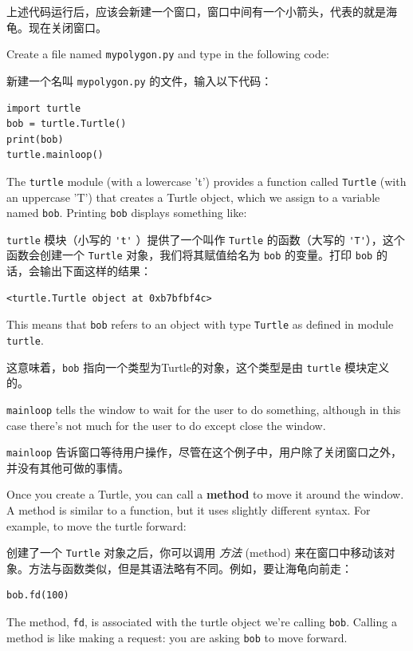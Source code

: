 上述代码运行后，应该会新建一个窗口，窗口中间有一个小箭头，代表的就是海龟。现在关闭窗口。

Create a file named {\tt mypolygon.py} and type in the following
code:

新建一个名叫  \lstinline{mypolygon.py} 的文件，输入以下代码：

\begin{lstlisting}
import turtle
bob = turtle.Turtle()
print(bob)
turtle.mainloop()
\end{lstlisting}


%
The {\tt turtle} module (with a lowercase 't') provides a function
called {\tt Turtle} (with an uppercase 'T') that creates a Turtle
object, which we assign to a variable named {\tt bob}.
Printing {\tt bob} displays something like:

\lstinline{turtle} 模块（小写的 \lstinline{'t'} ）提供了一个叫作 \lstinline{Turtle} 的函数（大写的 \lstinline{'T'}），这个函数会创建一个 \lstinline{Turtle} 对象，我们将其赋值给名为 \lstinline{bob} 的变量。打印 \lstinline{bob} 的话，会输出下面这样的结果：

\begin{lstlisting}
<turtle.Turtle object at 0xb7bfbf4c>
\end{lstlisting}

%
This means that {\tt bob} refers to an object with type
{\tt Turtle}
as defined in module {\tt turtle}.

这意味着，\lstinline{bob} 指向一个类型为Turtle的对象，这个类型是由 \lstinline{turtle} 模块定义的。

\verb"mainloop" tells the window to wait for the user
to do something, although in this case there's not much for
the user to do except close the window.

\lstinline{mainloop} 告诉窗口等待用户操作，尽管在这个例子中，用户除了关闭窗口之外，并没有其他可做的事情。

Once you create a Turtle, you can call a {\bf method} to move it
around the window.  A method is similar to a function, but it
uses slightly different syntax.  For example, to move the turtle
forward:

创建了一个 \lstinline{Turtle} 对象之后，你可以调用 \emph{方法} (method) 来在窗口中移动该对象。方法与函数类似，但是其语法略有不同。例如，要让海龟向前走：

\begin{lstlisting}
bob.fd(100)
\end{lstlisting}

%
The method, {\tt fd}, is associated with the turtle
object we're calling {\tt bob}.
Calling a method is like making a request: you are asking {\tt bob}
to move forward.

